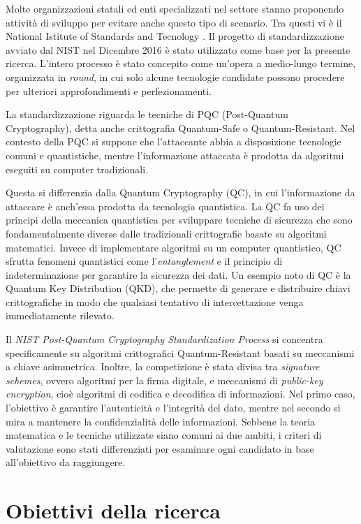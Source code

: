 Molte organizzazioni statali ed enti specializzati nel settore stanno proponendo attività di sviluppo per evitare anche questo tipo di scenario. Tra questi vi è il National Istitute of Standards and Tecnology \cite{nist-website}. Il progetto di standardizzazione avviato dal NIST nel Dicembre 2016 è stato utilizzato come base per la presente ricerca. L'intero processo è stato concepito come un'opera a medio-lungo termine, organizzata in \textit{round}, in cui solo alcune tecnologie candidate possono procedere per ulteriori approfondimenti e perfezionamenti.

La standardizzazione riguarda le tecniche di PQC (Post-Quantum Cryptography), detta anche crittografia Quantum-Safe o Quantum-Resistant. Nel contesto della PQC si suppone che l'attaccante abbia a disposizione tecnologie comuni e quantistiche, mentre l'informazione attaccata è prodotta da algoritmi eseguiti su computer tradizionali.

Questa si differenzia dalla Quantum Cryptography (QC), in cui l'informazione da attaccare è anch'essa prodotta da tecnologia quantistica. La QC fa uso dei principi della meccanica quantistica per sviluppare tecniche di sicurezza che sono fondamentalmente diverse dalle tradizionali crittografie basate su algoritmi matematici. Invece di implementare algoritmi su un computer quantistico, QC sfrutta fenomeni quantistici come l'\textit{entanglement} e il principio di indeterminazione per garantire la sicurezza dei dati. Un esempio noto di QC è la Quantum Key Distribution (QKD), che permette di generare e distribuire chiavi crittografiche in modo che qualsiasi tentativo di intercettazione venga immediatamente rilevato.

Il \textit{NIST Post-Quantum Cryptography Standardization Process} \cite{nist-pqc} si concentra specificamente su algoritmi crittografici Quantum-Resistant basati su meccanismi a chiave asimmetrica. Inoltre, la competizione è stata divisa tra \textit{signature schemes}, ovvero algoritmi per la firma digitale, e meccanismi di \textit{public-key encryption}, cioè algoritmi di codifica e decodifica di informazioni. Nel primo caso, l'obiettivo è garantire l'autenticità e l'integrità del dato, mentre nel secondo si mira a mantenere la confidenzialità delle informazioni. Sebbene la teoria matematica e le tecniche utilizzate siano comuni ai due ambiti, i criteri di valutazione sono stati differenziati per esaminare ogni candidato in base all'obiettivo da raggiungere.

\section{Obiettivi della ricerca}

